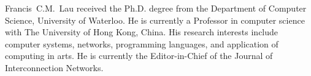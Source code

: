 \begin{IEEEbiography}{Francis~C.M.~Lau}
    received the Ph.D.
    degree from the Department of Computer Science,
    University of Waterloo. He is currently a Professor
    in computer science with The University of Hong
    Kong, China. His research interests include computer systems, networks, programming languages,
    and application of computing in arts. He is currently
    the Editor-in-Chief of the Journal of Interconnection
    Networks.
\end{IEEEbiography}
\vspace{-1cm}
